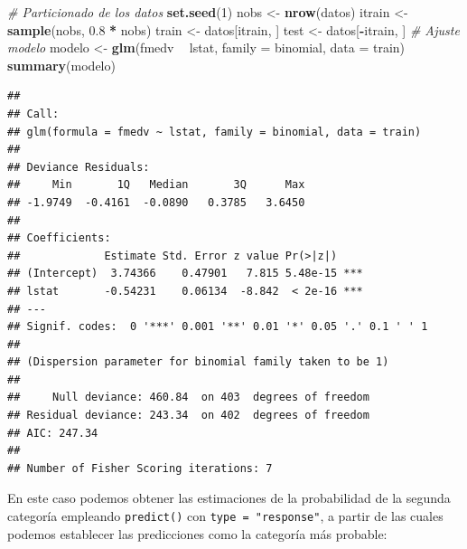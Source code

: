 \documentclass[
  spanish,
]{book}
\newenvironment{Shaded}{\begin{snugshade}}{\end{snugshade}}
\newcommand{\CommentTok}[1]{\textcolor[rgb]{0.56,0.35,0.01}{\textit{#1}}}
\newcommand{\DataTypeTok}[1]{\textcolor[rgb]{0.13,0.29,0.53}{#1}}
\newcommand{\DecValTok}[1]{\textcolor[rgb]{0.00,0.00,0.81}{#1}}
\newcommand{\FloatTok}[1]{\textcolor[rgb]{0.00,0.00,0.81}{#1}}
\newcommand{\KeywordTok}[1]{\textcolor[rgb]{0.13,0.29,0.53}{\textbf{#1}}}
\newcommand{\NormalTok}[1]{#1}
\newcommand{\OperatorTok}[1]{\textcolor[rgb]{0.81,0.36,0.00}{\textbf{#1}}}
\newcommand{\StringTok}[1]{\textcolor[rgb]{0.31,0.60,0.02}{#1}}
\theoremstyle{break}
\theoremstyle{definition}
\theoremstyle{definition}
\theoremstyle{definition}
\theoremstyle{remark}
\begin{document}
\begin{Shaded}
\begin{Highlighting}[]
\CommentTok{# Particionado de los datos}
\KeywordTok{set.seed}\NormalTok{(}\DecValTok{1}\NormalTok{)}
\NormalTok{nobs <-}\StringTok{ }\KeywordTok{nrow}\NormalTok{(datos)}
\NormalTok{itrain <-}\StringTok{ }\KeywordTok{sample}\NormalTok{(nobs, }\FloatTok{0.8} \OperatorTok{*}\StringTok{ }\NormalTok{nobs)}
\NormalTok{train <-}\StringTok{ }\NormalTok{datos[itrain, ]}
\NormalTok{test <-}\StringTok{ }\NormalTok{datos[}\OperatorTok{-}\NormalTok{itrain, ]}
\CommentTok{# Ajuste modelo}
\NormalTok{modelo <-}\StringTok{ }\KeywordTok{glm}\NormalTok{(fmedv }\OperatorTok{~}\StringTok{ }\NormalTok{lstat, }\DataTypeTok{family =}\NormalTok{ binomial, }\DataTypeTok{data =}\NormalTok{ train)}
\KeywordTok{summary}\NormalTok{(modelo)}
\end{Highlighting}
\end{Shaded}

\begin{verbatim}
## 
## Call:
## glm(formula = fmedv ~ lstat, family = binomial, data = train)
## 
## Deviance Residuals: 
##     Min       1Q   Median       3Q      Max  
## -1.9749  -0.4161  -0.0890   0.3785   3.6450  
## 
## Coefficients:
##             Estimate Std. Error z value Pr(>|z|)    
## (Intercept)  3.74366    0.47901   7.815 5.48e-15 ***
## lstat       -0.54231    0.06134  -8.842  < 2e-16 ***
## ---
## Signif. codes:  0 '***' 0.001 '**' 0.01 '*' 0.05 '.' 0.1 ' ' 1
## 
## (Dispersion parameter for binomial family taken to be 1)
## 
##     Null deviance: 460.84  on 403  degrees of freedom
## Residual deviance: 243.34  on 402  degrees of freedom
## AIC: 247.34
## 
## Number of Fisher Scoring iterations: 7
\end{verbatim}

En este caso podemos obtener las estimaciones de la probabilidad de la segunda categoría empleando \texttt{predict()} con \texttt{type\ =\ "response"}, a partir de las cuales podemos establecer las predicciones como la categoría más probable:

\begin{Shaded}
\end{Shaded}
\end{document}
